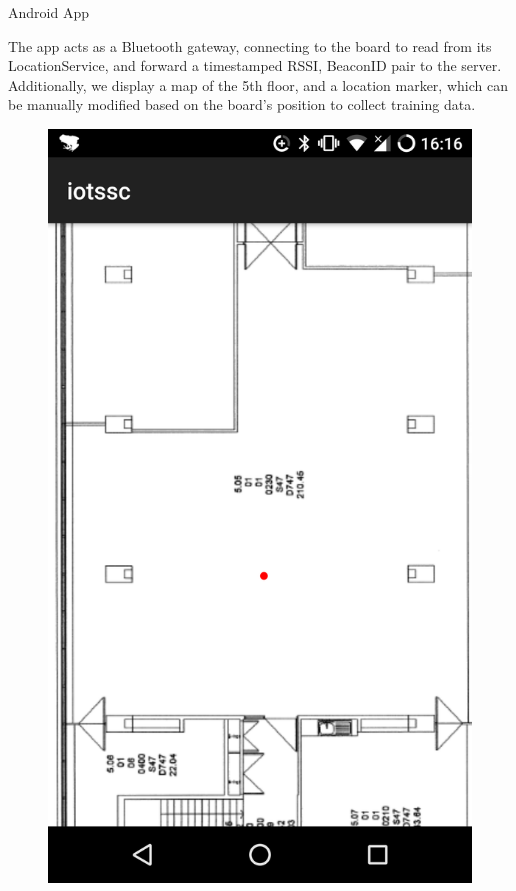 \documentclass[landscape]{infslides}
\begin{document}
\begin{slide}{Android App}
    \begin{multicols}{2}
        The app acts as a Bluetooth gateway, connecting to the board to read from its LocationService, and forward a timestamped RSSI, BeaconID pair to the server.\\
        Additionally, we display a map of the 5th floor, and a location marker, which can be manually modified based on the board's position to collect training data.
        \begin{figure}
            \includegraphics[scale=0.2,right]{Screenshot.png}
        \end{figure}
    \end{multicols}
\end{slide}
\end{document}
